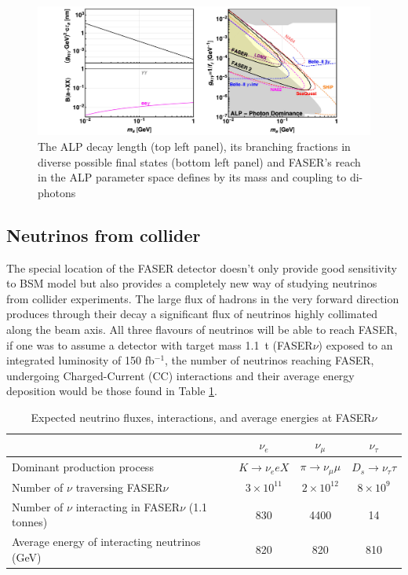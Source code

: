 		\begin{figure}[h]
			\centering
			\includegraphics[width=0.9\linewidth]{files/ALP_photon_production}
			\caption{The ALP decay length (top left panel), its branching fractions in diverse possible final states (bottom left panel) and FASER's reach in the ALP parameter space defines by its mass and coupling to di-photons}
			\label{im:ALP_photon_prod}
		\end{figure}
		
			
		\subsection{Neutrinos from collider}
		The special location of the FASER detector doesn't only provide good sensitivity to BSM model but also provides a completely new way of studying neutrinos from collider experiments. The large flux of hadrons in the very forward direction produces through their decay a significant flux of neutrinos highly collimated along the beam axis. All three flavours of neutrinos will be able to reach FASER, if one was to assume a detector with target mass \SI{1.1}{\tonne} (FASER$\nu$) exposed to an integrated luminosity of 150 fb$^{-1}$, the number of neutrinos reaching FASER, undergoing Charged-Current (CC) interactions and their average energy deposition would be those found in Table \ref{tab:neutrinos_flux}.
		\begin{table}[h]
    		\centering
    		\begin{tabular}{|l|c|c|c|}
        		\hline
        		& $\nu_e$ & $\nu_\mu$ & $\nu_\tau$ \\
       		 	\hline
       		 	Dominant production process & $K \to \nu_e e X$ & $\pi \to \nu_\mu \mu$ & $D_s \to \nu_\tau \tau$ \\
        		\hline
        		Number of $\nu$ traversing FASER$\nu$ & $3 \times 10^{11}$ & $2 \times 10^{12}$ & $8 \times 10^{9}$ \\
        		\hline
        		Number of $\nu$ interacting in FASER$\nu$ (1.1 tonnes) & 830 & 4400 & 14 \\
        		\hline
        		Average energy of interacting neutrinos (GeV) & 820 & 820 & 810 \\
        		\hline
    		\end{tabular}
    		\caption{Expected neutrino fluxes, interactions, and average energies at FASER$\nu$ \cite{FASER_Detector}}
    		\label{tab:neutrinos_flux}
		\end{table}  
		
